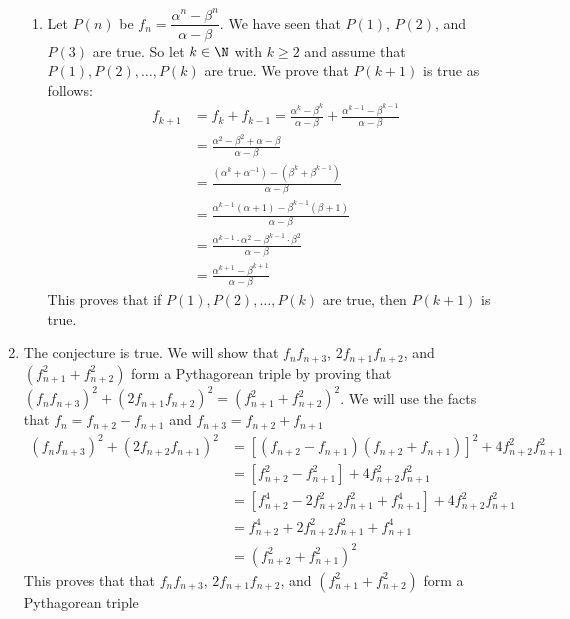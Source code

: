\begin{enumerate}
\begin{enumerate}
\item Let $P(n)$ be $f_n = \dfrac{\alpha^n - \beta^n}{\alpha - \beta}$.  We have seen that $P(1)$, $P(2)$, and $P(3)$ are true.  So let $k \in \N$ with $k \geq 2$ and assume that $P(1), P(2), \ldots, P(k)$ are true.  We prove that $P(k + 1)$ is true as follows:
\begin{align*}
f_{k+1} &= f_k + f_{k-1} = \frac{\alpha^k - \beta^k}{\alpha - \beta} + \frac{\alpha^{k-1} - \beta^{k-1}}{\alpha - \beta} \\
    &= \frac{\alpha^2 - \beta^2 + \alpha - \beta}{\alpha - \beta} \\
    &= \frac{\left( \alpha^k + \alpha^{-1} \right) - \left(\beta^k + \beta^{k-1} \right)}{\alpha - \beta} \\
    &= \frac{ \alpha^{k-1}(\alpha + 1) - \beta^{k-1}(\beta + 1)}{\alpha - \beta} \\
    &= \frac{\alpha^{k-1} \cdot \alpha^2 - \beta^{k-1} \cdot \beta^2}{ \alpha - \beta} \\
    &= \frac{\alpha^{k+1} - \beta^{k+1}}{\alpha - \beta}
\end{align*}
This proves that if $P(1), P(2), \ldots, P(k)$ are true, then $P(k + 1)$ is true.
\end{enumerate}



\item The conjecture is true.  We will show that $f_nf_{n+3}$, $2f_{n+1}f_{n+2}$, and 
$\left( f_{n+1}^2 + f_{n+2}^2 \right)$ form a Pythagorean triple by proving that 
$\left( f_nf_{n+3} \right)^2 + \left( 2f_{n+1}f_{n+2} \right)^2 = \left( f_{n+1}^2 + f_{n+2}^2 \right)^2$.  We will use the facts that $f_n = f_{n+2} - f_{n+1}$ and $f_{n+3} = f_{n+2} + f_{n+1}$
\begin{align*}
\left( f_nf_{n+3} \right)^2 + \left( 2f_{n+2}f_{n+1} \right)^2 &= 
\left[ \left( f_{n+2} - f_{n+1} \right)\left( f_{n+2} + f_{n+1} \right) \right]^2 + 4f_{n+2}^2 f_{n+1}^2 \\
   &= \left[ f_{n+2}^2 - f_{n+1}^2 \right] + 4f_{n+2}^2 f_{n+1}^2 \\
   &= \left[ f_{n+2}^4 - 2f_{n+2}^2 f_{n+1}^2 + f_{n+1}^4 \right] + 4f_{n+2}^2 f_{n+1}^2 \\
   &= f_{n+2}^4 + 2f_{n+2}^2 f_{n+1}^2 + f_{n+1}^4 \\
   &= \left( f_{n+2}^2 + f_{n+1}^2 \right)^2
\end{align*}
This proves that that $f_nf_{n+3}$, $2f_{n+1}f_{n+2}$, and 
$\left( f_{n+1}^2 + f_{n+2}^2 \right)$ form a Pythagorean triple



\end{enumerate}

